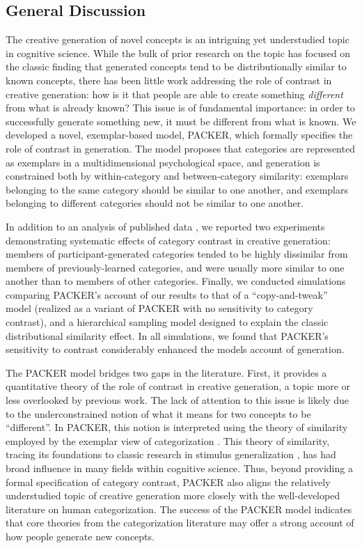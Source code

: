\documentclass[12pt]{article}
\begin{document}
\begin{flushleft}
\section{General Discussion}

The creative generation of novel concepts is an intriguing yet understudied topic in cognitive science. While the bulk of prior research on the topic has focused on the classic finding that generated concepts tend to be distributionally similar to known concepts, there has been little work addressing the role of contrast in creative generation: how is it that people are able to create something {\em different} from what is already known? This issue is of fundamental importance: in order to successfully generate something new, it must be different from what is known. We developed a novel, exemplar-based model, PACKER, which formally specifies the role of contrast in generation. The model proposes that categories are represented as exemplars in a multidimensional psychological space, and generation is constrained both by within-category and between-category similarity: exemplars belonging to the same category should be similar to one another, and exemplars belonging to different categories should not be similar to one another. 

In addition to an analysis of published data \citep[][Experiment 3]{jern2013probabilistic}, we reported two experiments demonstrating systematic effects of category contrast in creative generation: members of participant-generated categories tended to be highly dissimilar from members of previously-learned categories, and were usually more similar to one another than to members of other categories. Finally, we conducted simulations comparing PACKER's account of our results to that of a ``copy-and-tweak'' model (realized as a variant of PACKER with no sensitivity to category contrast), and a hierarchical sampling model designed to explain the classic distributional similarity effect. In all simulations, we found that PACKER's sensitivity to contrast considerably enhanced the models account of generation.

The PACKER model bridges two gaps in the literature. First, it provides a quantitative theory of the role of contrast in creative generation, a topic more or less overlooked by previous work. The lack of attention to this issue is likely due to the underconstrained notion of what it means for two concepts to be ``different''. In PACKER, this notion is interpreted using the theory of similarity employed by the exemplar view of categorization \citep{medin1978context,brooks1978nonanalytic,nosofsky1984choice,nosofsky1986attention}. This theory of similarity, tracing its foundations to classic research in stimulus generalization \citep{attneave1950,shepard1957stimulus,shepard1987toward}, has had broad influence in many fields within cognitive science. Thus, beyond providing a formal specification of category contrast, PACKER also aligns the relatively understudied topic of creative generation more closely with the well-developed literature on human categorization. The success of the PACKER model indicates that core theories from the categorization literature may offer a strong account of how people generate new concepts. 


\end{flushleft}
\end{document}
